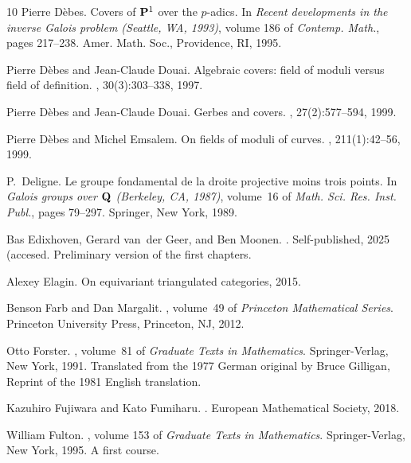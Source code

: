 \documentclass[10pt]{amsart}
\theoremstyle{definition}
\begin{document}
\begin{thebibliography}{10}
Pierre D\`ebes.
\newblock Covers of {${\bf P}^1$} over the {$p$}-adics.
\newblock In {\em Recent developments in the inverse {G}alois problem
  ({S}eattle, {WA}, 1993)}, volume 186 of {\em Contemp. Math.}, pages 217--238.
  Amer. Math. Soc., Providence, RI, 1995.

Pierre D{\`e}bes and Jean-Claude Douai.
\newblock Algebraic covers: field of moduli versus field of definition.
, 30(3):303--338, 1997.

Pierre D\`ebes and Jean-Claude Douai.
\newblock Gerbes and covers.
, 27(2):577--594, 1999.

Pierre D{\`e}bes and Michel Emsalem.
\newblock On fields of moduli of curves.
, 211(1):42--56, 1999.

P.~Deligne.
\newblock Le groupe fondamental de la droite projective moins trois points.
\newblock In {\em Galois groups over {${\bf Q}$} ({B}erkeley, {CA}, 1987)},
  volume~16 of {\em Math. Sci. Res. Inst. Publ.}, pages 79--297. Springer, New
  York, 1989.

Bas Edixhoven, Gerard van~der Geer, and Ben Moonen.
.
\newblock Self-published, 2025 (accesed.
\newblock Preliminary version of the first chapters.

Alexey Elagin.
\newblock On equivariant triangulated categories, 2015.

Benson Farb and Dan Margalit.
, volume~49 of {\em Princeton
  Mathematical Series}.
\newblock Princeton University Press, Princeton, NJ, 2012.

Otto Forster.
, volume~81 of {\em Graduate
  Texts in Mathematics}.
\newblock Springer-Verlag, New York, 1991.
\newblock Translated from the 1977 German original by Bruce Gilligan, Reprint
  of the 1981 English translation.

Kazuhiro Fujiwara and Kato Fumiharu.
.
\newblock European Mathematical Society, 2018.

William Fulton.
, volume 153 of {\em Graduate Texts in
  Mathematics}.
\newblock Springer-Verlag, New York, 1995.
\newblock A first course.


\end{thebibliography}
\end{document}
